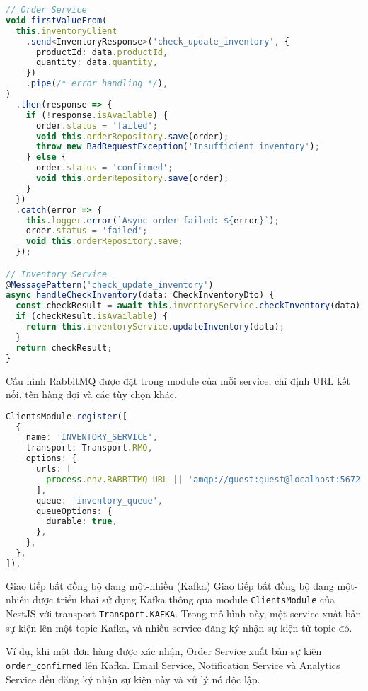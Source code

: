 \begin{lstlisting}[language=Typescript]
// Order Service
void firstValueFrom(
  this.inventoryClient
    .send<InventoryResponse>('check_update_inventory', {
      productId: data.productId,
      quantity: data.quantity,
    })
    .pipe(/* error handling */),
)
  .then(response => {
    if (!response.isAvailable) {
      order.status = 'failed';
      void this.orderRepository.save(order);
      throw new BadRequestException('Insufficient inventory');
    } else {
      order.status = 'confirmed';
      void this.orderRepository.save(order);
    }
  })
  .catch(error => {
    this.logger.error(`Async order failed: ${error}`);
    order.status = 'failed';
    void this.orderRepository.save;
  });

// Inventory Service
@MessagePattern('check_update_inventory')
async handleCheckInventory(data: CheckInventoryDto) {
  const checkResult = await this.inventoryService.checkInventory(data);
  if (checkResult.isAvailable) {
    return this.inventoryService.updateInventory(data);
  }
  return checkResult;
}
\end{lstlisting}

Cấu hình RabbitMQ được đặt trong module của mỗi service, chỉ định URL kết nối, tên hàng đợi và các tùy chọn khác.

\begin{lstlisting}[language=Typescript]
ClientsModule.register([
  {
    name: 'INVENTORY_SERVICE',
    transport: Transport.RMQ,
    options: {
      urls: [
        process.env.RABBITMQ_URL || 'amqp://guest:guest@localhost:5672',
      ],
      queue: 'inventory_queue',
      queueOptions: {
        durable: true,
      },
    },
  },
]),
\end{lstlisting}

Giao tiếp bất đồng bộ dạng một-nhiều (Kafka)
Giao tiếp bất đồng bộ dạng một-nhiều được triển khai sử dụng Kafka thông qua module \texttt{ClientsModule} của NestJS với transport \texttt{Transport.KAFKA}. Trong mô hình này, một service xuất bản sự kiện lên một topic Kafka, và nhiều service đăng ký nhận sự kiện từ topic đó.

Ví dụ, khi một đơn hàng được xác nhận, Order Service xuất bản sự kiện \texttt{order\_confirmed} lên Kafka. Email Service, Notification Service và Analytics Service đều đăng ký nhận sự kiện này và xử lý nó độc lập.

